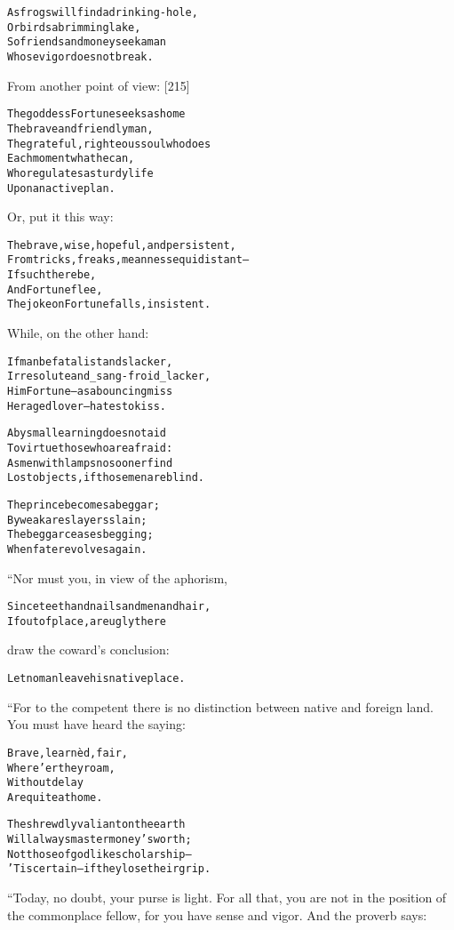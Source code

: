 \documentclass{article}
\renewenvironment{verbatim}{\begin{alltt}\normalfont\begin{centering}}{\end{centering}\end{alltt}}
\begin{document}
\begin{verbatim}
As frogs will find a drinking-hole,
    Or birds a brimming lake,
So friends and money seek a man
    Whose vigor does not break.
\end{verbatim}
From another point of view: [215]

\begin{verbatim}
The goddess Fortune seeks as home
    The brave and friendly man,
The grateful, righteous soul who does
    Each moment what he can,
Who regulates a sturdy life
    Upon an active plan.
\end{verbatim}
Or, put it this way:

\begin{verbatim}
The brave, wise, hopeful, and persistent,
From tricks, freaks, meanness equidistant--
    If such there be,
    And Fortune flee,
The joke on Fortune falls, insistent.
\end{verbatim}
While, on the other hand:

\begin{verbatim}
If man be fatalist and slacker,
Irresolute and _sang-froid_ lacker,
Him Fortune--as a bouncing miss
Her aged lover--hates to kiss.

Abysmal learning does not aid
To virtue those who are afraid:
As men with lamps no sooner find
Lost objects, if those men are blind.

The prince becomes a beggar;
    By weak are slayers slain;
The beggar ceases begging;
    When fate revolves again.
\end{verbatim}
“Nor must you, in view of the aphorism,

\begin{verbatim}
Since teeth and nails and men and hair,
If out of place, are ugly there
\end{verbatim}
draw the coward's conclusion:

\begin{verbatim}
Let no man leave his native place.
\end{verbatim}
“For to the competent there is no distinction between native and
foreign land. You must have heard the saying:

\begin{verbatim}
Brave, learnèd, fair,
    Where'er they roam,
Without delay
    Are quite at home.

The shrewdly valiant on the earth
Will always master money's worth;
Not those of godlike scholarship--
'Tis certain--if they lose their grip.
\end{verbatim}
“Today, no doubt, your purse is light. For all that, you are not in
the position of the commonplace fellow, for you have sense and
vigor. And the proverb says:
\end{document}
